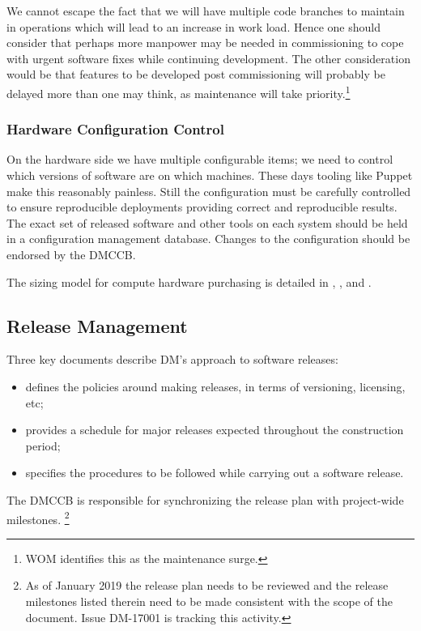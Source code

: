 We cannot escape the fact that we  will have multiple code branches to maintain in operations which will lead to an increase in work load.
Hence one should consider that perhaps more manpower may be needed in commissioning to cope with urgent software fixes while continuing development.
The other consideration would be that features to be developed post commissioning will probably be delayed more than one may think, as maintenance will take priority.\footnote{WOM identifies this as the maintenance surge.}

\subsubsection{Hardware Configuration Control}

On the hardware side we have multiple configurable items; we need to control which versions of software are on which machines. These days tooling like Puppet make this reasonably painless. Still the \gls{configuration}  must be carefully controlled to ensure reproducible deployments providing correct and reproducible results. The exact set of released software and other tools on each system should be held in a \gls{configuration} management database.
Changes to the \gls{configuration} should be endorsed by the \gls{DMCCB}.

The sizing model for compute hardware purchasing is detailed in , , and .

\subsection {Release Management} \label{sect:release}

Three key documents describe \gls{DM}'s approach to software releases:

\begin{itemize}
\item{ defines the policies around making releases, in terms of versioning, licensing, etc;}
\item{ provides a schedule for major releases expected throughout the construction period;}
\item{ specifies the procedures to be followed while carrying out a software release.}
\end{itemize}

The \gls{DMCCB} is responsible for synchronizing the release plan with project-wide milestones.
\footnote{As of January 2019 the release plan needs to be reviewed and the release milestones listed therein need to be made consistent with the scope of the document.
Issue \gls{DM}-17001 is tracking this activity.}

